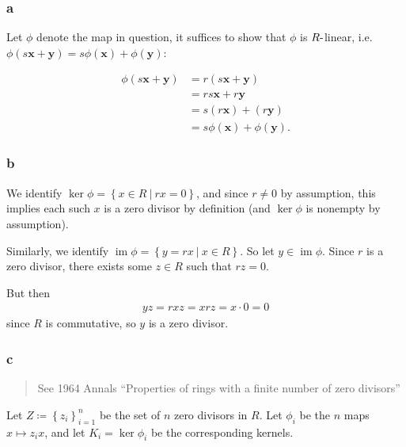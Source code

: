 \begin{solution}

\hypertarget{a-38}{%
\subsubsection{a}\label{a-38}}

Let \(\phi\) denote the map in question, it suffices to show that
\(\phi\) is \(R{\hbox{-}}\)linear,
i.e.~\(\phi(s\mathbf{x} + \mathbf{y}) = s\phi(\mathbf{x}) + \phi(\mathbf{y})\):

\begin{align*}
\phi(s\mathbf{x} + \mathbf{y}) 
&= r(s\mathbf{x} + \mathbf{y}) \\
&= rs\mathbf{x} + r\mathbf{y} \\
&= s(r\mathbf{x}) + (r\mathbf{y}) \\
&= s\phi(\mathbf{x}) + \phi(\mathbf{y})
.\end{align*}

\hypertarget{b-28}{%
\subsubsection{b}\label{b-28}}

We identify
\(\ker \phi = \left\{{x\in R {~\mathrel{\Big|}~}rx = 0}\right\}\), and
since \(r\neq 0\) by assumption, this implies each such \(x\) is a zero
divisor by definition (and \(\ker \phi\) is nonempty by assumption).

Similarly, we identify
\(\operatorname{im}\phi = \left\{{y = rx {~\mathrel{\Big|}~}x\in R}\right\}\).
So let \(y\in \operatorname{im}\phi\). Since \(r\) is a zero divisor,
there exists some \(z\in R\) such that \(rz = 0\).

But then
\begin{align*}
yz = rxz = xrz = x\cdot 0 = 0
\end{align*}
since \(R\) is commutative, so \(y\) is a zero divisor.

\hypertarget{c-21}{%
\subsubsection{c}\label{c-21}}

\begin{quote}
See 1964 Annals ``Properties of rings with a finite number of zero
divisors''
\end{quote}

Let \(Z \coloneqq\left\{{z_i}\right\}_{i=1}^n\) be the set of \(n\) zero
divisors in \(R\). Let \(\phi_i\) be the \(n\) maps \(x \mapsto z_i x\),
and let \(K_i = \ker \phi_i\) be the corresponding kernels.


\end{solution}
